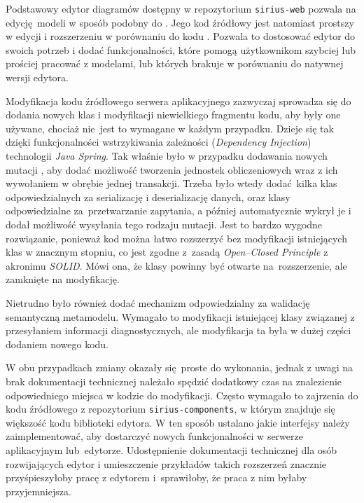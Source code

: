 Podstawowy edytor diagramów dostępny w repozytorium \texttt{sirius-web}
pozwala na edycję modeli w sposób podobny do \SiriusDesktop{}.
Jego kod źródłowy jest natomiast prostszy w edycji i rozszerzeniu w porównaniu
do kodu \SiriusDesktop{}. Pozwala to dostosować edytor do swoich potrzeb i
dodać funkcjonalności, które pomogą użytkownikom szybciej lub prościej pracować
z modelami, lub których brakuje w porównaniu do natywnej wersji edytora.

Modyfikacja kodu źródłowego serwera aplikacyjnego zazwyczaj sprowadza się do
dodania nowych klas i modyfikacji niewielkiego fragmentu kodu, aby były one
używane, chociaż nie~jest to wymagane w każdym przypadku. Dzieje się tak dzięki
funkcjonalności wstrzykiwania zależności (\emph{Dependency Injection})
technologii \emph{Java Spring}. Tak właśnie było w przypadku dodawania nowych
mutacji \GraphQL{}, aby dodać możliwość tworzenia jednostek obliczeniowych
wraz z ich wywołaniem w obrębie jednej transakcji. Trzeba było wtedy
dodać kilka klas odpowiedzialnych za serializację i deserializację danych, oraz
klasy odpowiedzialne za~przetwarzanie zapytania, a później \SiriusWeb{}
automatycznie wykrył je i dodał możliwość wysyłania tego rodzaju mutacji.
Jest to bardzo wygodne rozwiązanie, ponieważ kod można łatwo rozszerzyć bez
modyfikacji istniejących klas w znacznym stopniu, co jest zgodne z~zasadą
\emph{Open--Closed Principle} %
z akronimu \emph{SOLID}. Mówi ona, że klasy powinny być otwarte
na~rozszerzenie, ale zamknięte na modyfikację.

Nietrudno było również dodać mechanizm odpowiedzialny za walidację semantyczną
metamodelu. Wymagało to modyfikacji istniejącej klasy związanej z przesyłaniem
informacji diagnostycznych, ale modyfikacja ta była w dużej części dodaniem
nowego kodu.

W obu przypadkach zmiany okazały się proste do wykonania, jednak z uwagi na
brak dokumentacji technicznej \SiriusWeb{} należało spędzić dodatkowy czas
na znalezienie odpowiedniego miejsca w kodzie do modyfikacji. Często wymagało
to zajrzenia do kodu źródłowego z repozytorium \texttt{sirius-components}, w
którym znajduje się większość kodu biblioteki edytora. W ten sposób ustalano
jakie interfejsy należy
zaimplementować, aby dostarczyć nowych funkcjonalności w serwerze aplikacyjnym
lub~edytorze. Udostępnienie dokumentacji technicznej \SiriusWeb{} dla osób
rozwijających edytor i umieszczenie przykładów takich rozszerzeń znacznie
przyśpieszyłoby pracę z edytorem i~sprawiłoby, że praca z nim byłaby
przyjemniejsza.


